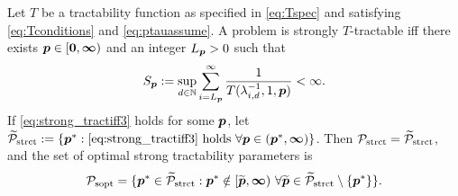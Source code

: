 \documentclass[11pt,a4paper]{article}
\newcommand{\peter}[1]{\begingroup\color{purple}#1\endgroup}
\begin{document}
\begin{theorem}\label{thm_main_strong_tract2}
Let $T$ be a tractability function as specified in \eqref{eq:Tspec} and satisfying \eqref{eq:Tconditions} and \eqref{eq:ptauassume}.  A problem is strongly $T$-tractable iff there exists $\boldsymbol{p} \in [\boldsymbol{0}, \boldsymbol{\infty})$ and an integer $L_{\boldsymbol{p}} > 0$ such that
\begin{equation} \label{eq:strong_tractiff3}
     S_{\boldsymbol{p}}:=\sup_{d \in \mathbb{N}} \sum_{i = L_{\boldsymbol{p}}}^\infty \frac{1}{T(\lambda_{i,d}^{-1},1,\boldsymbol{p})} < \infty.
\end{equation}
If \eqref{eq:strong_tractiff3} holds for some $\boldsymbol{p}$, let  $\widetilde{\mathcal{P}}_{\textup{strct}} : = \{\boldsymbol{p}^* : \eqref{eq:strong_tractiff3} \text{ holds }\forall \boldsymbol{p} \in (\boldsymbol{p}^*,\boldsymbol{\infty})\}$.  Then $\mathcal{P}_{\textup{strct}} = \widetilde{\mathcal{P}}_{\textup{strct}}$, and the set of optimal strong tractability parameters is
\[
	\mathcal{P}_{\textup{sopt}} =
	\{\boldsymbol{p}^* \in \widetilde{\mathcal{P}}_{\textup{strct}} :  \boldsymbol{p}^* \notin [\widetilde{\boldsymbol{p}},\boldsymbol{\infty}) \ \forall \widetilde{\boldsymbol{p}}\in  \widetilde{\mathcal{P}}_{\textup{strct}} \setminus \{\boldsymbol{p}^*\} \}.
\]
\end{theorem}
\end{document}
